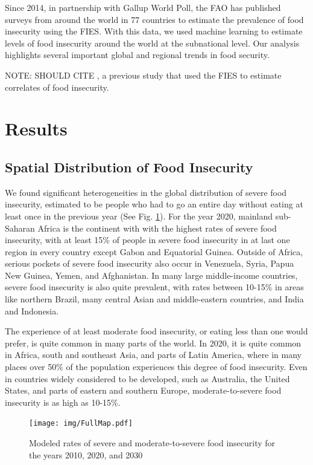 \documentclass{article}
\begin{document}
Since 2014, in partnership with Gallup World Poll, the FAO has published surveys from around the world in 77 countries to estimate the prevalence of food insecurity using the FIES.  With this data, we used machine learning to estimate levels of food insecurity around the world at the subnational level.  Our analysis highlights several important global and regional trends in food security.

NOTE: SHOULD CITE \citep{smith2017world}, a previous study that used the FIES to estimate correlates of food insecurity.


\section{Results}
\subsection{Spatial Distribution of Food Insecurity}
We found significant heterogeneities in the global distribution of severe food insecurity, estimated to be people who had to go an entire day without eating at least once in the previous year (See Fig. \ref{fig:map}).  For the year 2020, mainland sub-Saharan Africa is the continent with with the highest rates of severe food insecurity, with at least 15\% of people in severe food insecurity in at last one region in every country except Gabon and Equatorial Guinea.  Outside of Africa, serious pockets of severe food insecurity also occur in Venezuela, Syria, Papua New Guinea, Yemen, and Afghanistan.  In many large middle-income countries, severe food insecurity is also quite prevalent, with rates between 10-15\% in areas like northern Brazil, many central Asian and middle-eastern countries, and India and Indonesia.

The experience of at least moderate food insecurity, or eating less than one would prefer, is quite common in many parts of the world.  In 2020, it is quite common in Africa, south and southeast Asia, and parts of Latin America, where in many places over 50\% of the population experiences this degree of food insecurity.  Even in countries widely considered to be developed, such as Australia, the United States, and parts of eastern and southern Europe, moderate-to-severe food insecurity is as high as 10-15\%.  

\begin{landscape}
\begin{figure}[h]
  \centering
  \texttt{[image: img/FullMap.pdf]}
  \caption{Modeled rates of severe and moderate-to-severe food insecurity for the years 2010, 2020, and 2030}
  \label{fig:map}
\end{figure}
\end{landscape}
\end{document}
